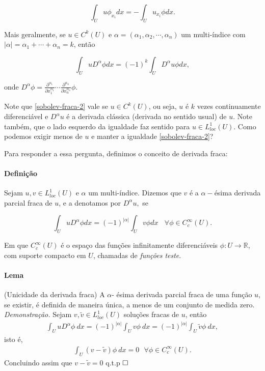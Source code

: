 \documentclass[a4paper, 11pt]{article}
\newcommand{\qed}{$\hfill\square$}
\newcommand{\R}{\mathbb{R}}
\begin{document}
\begin{equation}
	\int_{U} u \phi_{x_i} dx = - \int_{U} u_{x_i} \phi dx.
\end{equation}

Mais geralmente, se $u \in C^k(U)$ e $\alpha=(\alpha_1, \alpha_2, \cdots, \alpha_n)$ um multi-índice com $|\alpha|= \alpha_1 + \cdots +\alpha_n= k$, então

\begin{equation}\label{sobolev-fraca-2}
\int_{U} u D^{\alpha}\phi dx = (-1)^k \int_{U} D^{\alpha}u \phi dx,
\end{equation}

onde $D^{\alpha} \phi= \frac{\partial ^{\alpha_1}}{\partial x_1^{\alpha_1}}\cdots \frac{\partial ^{\alpha_n}}{\partial x_n^{\alpha_n}}\phi$.

Note que \eqref{sobolev-fraca-2} vale se $u \in C^k(U)$, ou seja, $u$ é $k$ vezes continuamente diferenciável e $D^{\alpha}u$ é a derivada clássica (derivada no sentido usual) de $u$. Note também, que o lado esquerdo  da igualdade faz sentido para $u \in L^1_{loc}(U)$. Como podemos exigir menos de $u$ e manter a igualdade \eqref{sobolev-fraca-2}?

Para responder a essa pergunta, definimos o conceito de derivada fraca:

\paragraph{Definição} Sejam $u,v \in L^1_{loc}(U)$ e $\alpha$ um multi-índice. Dizemos que $v$ é a $\alpha-$ésima derivada parcial fraca de $u$, e a denotamos por $D^{\alpha}u,$ se 

\begin{equation}\label{derivadafraca}
   \int_{U} u D^{\alpha}\phi dx = (-1)^{|\alpha|} \int_{U} v \phi dx  \ \ \ \ \forall \phi \in C^{\infty}_c(U).
   \end{equation}

Em que \( C^{\infty}_c (U) \) é o espaço das funções infinitamente diferenciáveis \( \phi:U\rightarrow \R \), com suporte compacto em \( U \), chamadas de \textit{funções teste}. 

\paragraph{Lema}(Unicidade da derivada fraca) A $\alpha$- ésima derivada parcial fraca de uma função $u$, se existir, é definida de maneira única, a menos de um conjunto de medida zero.
\textit{Demonstração.} Sejam $v, \tilde{v} \in L^1_{loc}(U)$ soluções fracas de $u$, então
 \begin{align*}
     \int_{U}u D^{\alpha}\phi \ dx = (-1)^{|\alpha|} \int _U v \phi \ dx= (-1)^{|\alpha|} \int _U \tilde{v} \phi \ dx,
 \end{align*}
isto é,
\begin{align*}
    \int_{U} (v - \tilde{v}) \phi \ dx = 0 \ \ \ \forall \phi \in C^{\infty}_c(U).
\end{align*}
Concluindo assim que $v-\tilde{v}=0$ q.t.p \qed
\end{document}
